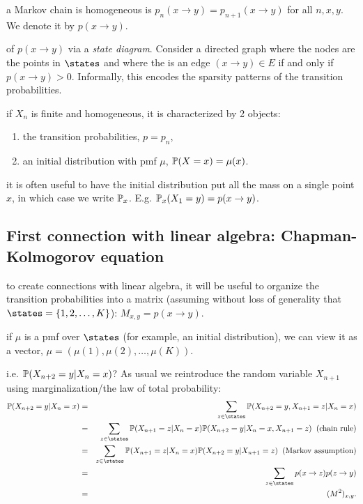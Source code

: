 \documentclass{article}
\begin{document}
 a Markov chain is homogeneous is $p_n(x \to y) = p_{n+1}(x \to y)$ for all $n, x, y$. We denote it by $p(x \to y)$. 

 of $p(x \to y)$ via a \emph{state diagram}. Consider a directed graph where the nodes are the points in $\states$ and where the is an edge $(x \to y) \in E$ if and only if $p(x \to y) > 0$. Informally, this encodes the sparsity patterns of the transition probabilities.

 if $X_n$ is finite and homogeneous, it is characterized by 2 objects:
\begin{enumerate}
  \item the transition probabilities, $p = p_n$,
  \item an initial distribution with pmf $\mu$, $\P(X = x) = \mu(x)$. 
\end{enumerate} 

 it is often useful to have the initial distribution put all the mass on a single point $x$, in which case we write $\P_x$. E.g. $\P_x(X_1 = y) = p(x \to y)$. 


\subsection{First connection with linear algebra: Chapman-Kolmogorov equation}

 to create connections with linear algebra, it will be useful to organize the transition probabilities into a matrix (assuming without loss of generality that $\states = \{1, 2, \dots, K\}$): $M_{x,y} = p(x \to y)$.

 if $\mu$ is a pmf over $\states$ (for example, an initial distribution), we can view it as a vector, $\mu = (\mu(1), \mu(2), \dots, \mu(K))$. 

 i.e. $\P(X_{n+2} = y | X_n = x)$? As usual we reintroduce the random variable $X_{n+1}$ using marginalization/the law of total probability:
\begin{eqnarray*}
\P(X_{n+2} = y | X_n = x) &=& \sum_{z \in \states} \P(X_{n+2} = y, X_{n+1} = z | X_n = x) \\
&=& \sum_{z \in \states} \P(X_{n+1} = z | X_n = x) \P(X_{n+2} = y | X_n = x, X_{n+1} = z) \;\;(\text{chain rule}) \\
&=& \sum_{z \in \states} \P(X_{n+1} = z | X_n = x) \P(X_{n+2} = y | X_{n+1} = z) \;\;(\text{Markov assumption}) \\
&=& \sum_{z \in \states} p(x \to z) p(z \to y) \\
&=& (M^2)_{x,y}.
\end{eqnarray*} 
\end{document}
